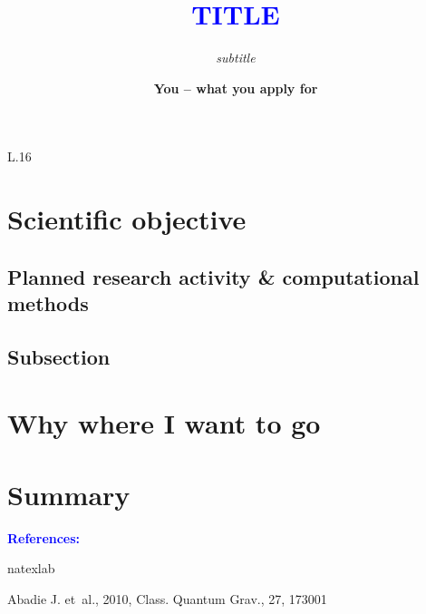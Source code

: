\documentclass[12pt,letter]{scrartcl}%
\title{\vspace*{-25pt}\textcolor{blue}{TITLE}}
\subtitle{\small  \emph{subtitle}}
\author{\normalsize \textbf{You -- what you apply for}}
\date{}
\let\olditem\item
\renewenvironment{thebibliography}[1]{%
    \vspace{5pt}\noindent\textbf{\textcolor{blue}{References:}\\[3pt]}
    \let\par\relax\let\newblock\relax%
    \renewcommand\labelenumi{\bfseries\theenumi~}
      \begin{inparaenum}%
}{\end{inparaenum}}
\begin{document}
\maketitle
\noindent
\vspace*{-50pt}



\begin{wrapfigure}[20]{L}{.16\textwidth}
  \setlength{\abovecaptionskip}{-4pt}
  \centering
\end{wrapfigure}
\setcounter{figure}{1}

\section*{Scientific objective\,\,}

\subsection*{Planned research activity \& computational methods}


\subsection*{Subsection}

\section*{Why where I want to go}

\section*{Summary\,\,}






\def\aj{AJ }
\def\apj{ApJ }
\def\apss{Astrophys. Space Sci.}
\def\apjl{ApJL }
\def\apjs{ApJS }
\def\aa{A\&A }
\def\aap{A\&A }
\def\araa{ARAA }
\def\mnras{MNRAS }
\def\mnrasl{MNRASL }
\def\cqg{Class. Quantum Grav.}
\def\prl{PRL}



\setlength{\bibsep}{0.7pt}

\tiny
\begin{thebibliography}{1}
\expandafter\ifx\csname natexlab\endcsname\relax\def\natexlab#1{#1}\fi

\color{gray!80!black}

{Abadie} J. {et~al.}, 2010, \cqg, 27, 173001


\end{thebibliography}
\end{document}
